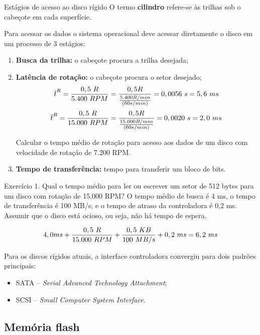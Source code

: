 \begin{frame}{Estágios de acesso ao disco rígido}
\small
  O termo {\bf cilindro} refere-se às trilhas sob o cabeçote em cada
superfície.

Para acessar os dados o sistema operacional deve acessar diretamente o
disco em um processo de 3 estágios:


  \begin{enumerate}
\item {\bf Busca da trilha:} o cabeçote procura a trilha desejada;
\item {\bf Latência de rotação:} o cabeçote procura o setor desejado;
  $$\overline{t}^R = {0,5\ R \over 5.400\ RPM}= { 0,5 R \over {5.400
    R/min \over (60 s/min)}} = 0,0056\ s = 5,6\ ms$$
  $$\overline{t}^R = {0,5\ R \over 15.000\ RPM}= { 0,5 R \over {15.000
    R/min \over (60 s/min)}} = 0,0020\ s = 2,0\ ms$$

Calcular o tempo médio de rotação para acesso aos dados de um disco
com velocidade de rotação de 7.200 RPM.

\item {\bf Tempo de transferência:} tempo para transferir um bloco de bits.
\end{enumerate}
\end{frame}

\begin{frame}{Exercício 1.} 
Qual o tempo médio para ler ou escrever um setor de 512 bytes para um
disco com rotação de 15.000 RPM? O tempo médio de busca é 4 ms, o
tempo de transferência é 100 MB/s, e o tempo de atraso da controladora
é 0,2 ms. Assumir que o disco está ocioso, ou seja, não há tempo de
espera.

\pause

$$ 4,0 ms + {0,5\ R \over 15.000\ RPM} + {0,5\ KB \over 100\ MB/s} +
0,2\ ms = 6,2\ ms$$

\pause\bigskip\small\color{blue}
Para os discos rígidos atuais, a interface controladora
convergiu para dois padrões principais:
\begin{itemize}
\item SATA -- {\em Serial Advanced Technology Attachment};
\item SCSI -- {\em Small Computer System Interface}.
\end{itemize}

\end{frame}


\subsection{Memória flash}

